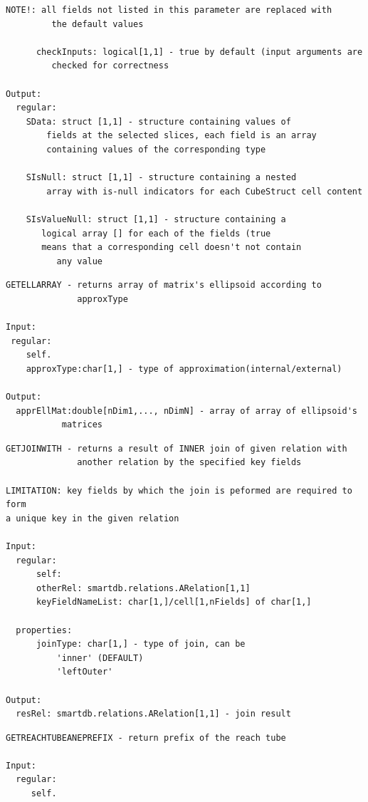 \documentclass[letterpaper,10pt,english]{sphinxmanual}
\begin{document}
\begin{Verbatim}[commandchars=\\\{\}]
         NOTE!: all fields not listed in this parameter are replaced with
         the default values

      checkInputs: logical[1,1] - true by default (input arguments are
         checked for correctness

Output:
  regular:
    SData: struct [1,1] - structure containing values of
        fields at the selected slices, each field is an array
        containing values of the corresponding type

    SIsNull: struct [1,1] - structure containing a nested
        array with is-null indicators for each CubeStruct cell content

    SIsValueNull: struct [1,1] - structure containing a
       logical array [] for each of the fields (true
       means that a corresponding cell doesn't not contain
          any value
\end{Verbatim}

\begin{Verbatim}[commandchars=\\\{\}]
GETELLARRAY - returns array of matrix's ellipsoid according to
              approxType

Input:
 regular:
    self.
    approxType:char[1,] - type of approximation(internal/external)

Output:
  apprEllMat:double[nDim1,..., nDimN] - array of array of ellipsoid's
           matrices
\end{Verbatim}

\begin{Verbatim}[commandchars=\\\{\}]
GETJOINWITH - returns a result of INNER join of given relation with
              another relation by the specified key fields

LIMITATION: key fields by which the join is peformed are required to form
a unique key in the given relation

Input:
  regular:
      self:
      otherRel: smartdb.relations.ARelation[1,1]
      keyFieldNameList: char[1,]/cell[1,nFields] of char[1,]

  properties:
      joinType: char[1,] - type of join, can be
          'inner' (DEFAULT)
          'leftOuter'

Output:
  resRel: smartdb.relations.ARelation[1,1] - join result
\end{Verbatim}

\begin{Verbatim}[commandchars=\\\{\}]
GETREACHTUBEANEPREFIX - return prefix of the reach tube

Input:
  regular:
     self.
\end{Verbatim}
\end{document}
